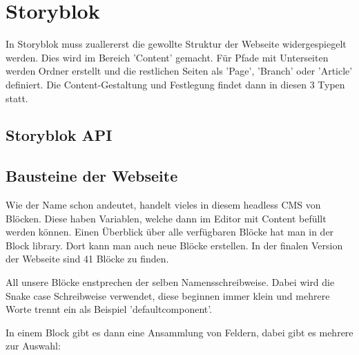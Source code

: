 

\section{Storyblok}

In Storyblok muss zuallererst die gewollte Struktur der Webseite widergespiegelt werden. Dies wird im Bereich 'Content' gemacht. 
Für Pfade mit Unterseiten werden Ordner erstellt und die restlichen Seiten  als 'Page', 'Branch' oder 'Article' definiert.
Die Content-Gestaltung und Festlegung findet dann in diesen 3 Typen statt. 


\subsection{Storyblok API}

\subsection{Bausteine der Webseite}
Wie der Name schon andeutet, handelt vieles in diesem headless CMS von Blöcken. Diese haben Variablen, welche dann im Editor mit Content befüllt werden können. 
Einen Überblick über alle verfügbaren Blöcke hat man in der Block library. Dort kann man auch neue Blöcke erstellen. In der finalen Version der Webseite sind 41 Blöcke zu finden. 

All unsere Blöcke enstprechen der selben Namensschreibweise. Dabei wird die Snake case Schreibweise verwendet, diese beginnen immer klein und mehrere Worte trennt ein \textunderscore  als Beispiel 'default\textunderscore component'.

In einem Block gibt es dann eine Ansammlung von Feldern, dabei gibt es mehrere zur Auswahl:


